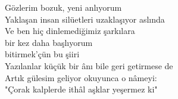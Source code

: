 \noindent\newline
Gözlerim bozuk, yeni anlıyorum \\
Yaklaşan insan silüetleri uzaklaşıyor aslında \\
Ve ben hiç dinlemediğimiz şarkılara \\
bir kez daha başlıyorum \\
bitirmek'çün bu şiiri \\
Yazılanlar küçük bir ânı bile geri getirmese de \\
Artık gülesim geliyor okuyunca o nâmeyi: \\
	"Çorak kalplerde ithâl aşklar yeşermez ki" \\